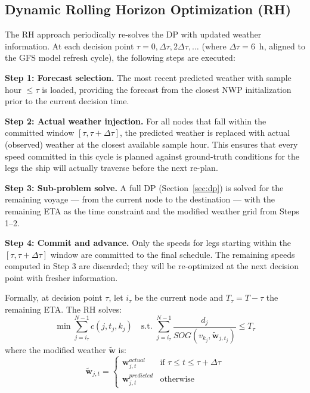 \documentclass[review,authoryear]{elsarticle}  %
\begin{document}
\subsection{Dynamic Rolling Horizon Optimization (RH)}
\label{sec:rh}

The RH approach periodically re-solves the DP with updated weather information. At each decision point $\tau = 0, \Delta\tau, 2\Delta\tau, \ldots$ (where $\Delta\tau = 6$~h, aligned to the GFS model refresh cycle), the following steps are executed:

\textbf{Step 1: Forecast selection.} The most recent predicted weather with sample hour $\leq \tau$ is loaded, providing the forecast from the closest NWP initialization prior to the current decision time.

\textbf{Step 2: Actual weather injection.} For all nodes that fall within the committed window $[\tau, \tau + \Delta\tau]$, the predicted weather is replaced with actual (observed) weather at the closest available sample hour. This ensures that every speed committed in this cycle is planned against ground-truth conditions for the legs the ship will actually traverse before the next re-plan.

\textbf{Step 3: Sub-problem solve.} A full DP (Section~\ref{sec:dp}) is solved for the remaining voyage --- from the current node to the destination --- with the remaining ETA as the time constraint and the modified weather grid from Steps 1--2.

\textbf{Step 4: Commit and advance.} Only the speeds for legs starting within the $[\tau, \tau + \Delta\tau]$ window are committed to the final schedule. The remaining speeds computed in Step 3 are discarded; they will be re-optimized at the next decision point with fresher information.

Formally, at decision point $\tau$, let $i_\tau$ be the current node and $T_\tau = T - \tau$ the remaining ETA. The RH solves:
\begin{equation}
    \min \sum_{j=i_\tau}^{N-1} c(j, t_j, k_j) \quad \text{s.t. } \sum_{j=i_\tau}^{N-1} \frac{d_j}{SOG(v_{k_j}, \tilde{\mathbf{w}}_{j,t_j})} \leq T_\tau
    \label{eq:rh-obj}
\end{equation}
where the modified weather $\tilde{\mathbf{w}}$ is:
\begin{equation}
    \tilde{\mathbf{w}}_{j,t} = \begin{cases}
    \mathbf{w}^{actual}_{j,t} & \text{if } \tau \leq t \leq \tau + \Delta\tau \\
    \mathbf{w}^{predicted}_{j,t} & \text{otherwise}
    \end{cases}
    \label{eq:rh-weather}
\end{equation}
\end{document}
